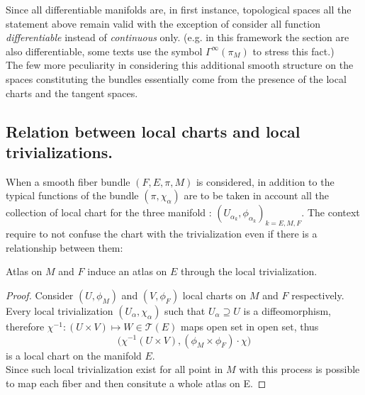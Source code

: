 \documentclass[a4paper,12pt]{scrartcl}    %
\begin{document}
Since all differentiable manifolds are, in first instance, topological spaces all the statement above remain valid with the exception of consider all function \emph{differentiable} instead of \emph{continuous} only.
(e.g. in this framework the section are also differentiable, some texts use the symbol $\Gamma^{\infty} (\pi_M)$ to stress this fact.) 
\\
The few more peculiarity in considering this additional smooth structure on the spaces constituting the bundles essentially come from the presence of the local charts and the tangent spaces.

\subsection{Relation between local charts and local trivializations.}
When a smooth fiber bundle $(F,E,\pi,M)$ is considered, in addition to the typical functions of the bundle $(\pi, \chi_{\alpha})$ are to be taken in account all the collection of local chart for the three manifold : $(U_{\alpha_k}, \phi_{\alpha_k})_{k = E,M,F}$.
The context require to not confuse the chart with the trivialization even if there is a relationship between them:

\begin{proposition}
Atlas on $M$ and $F$ induce an atlas on $E$ through the local trivialization.
\end{proposition}
\begin{proof}
Consider $(U, \phi_{M})$ and $(V, \phi_{F})$ local charts on $M$ and $F$ respectively.
\\
Every local trivialization $(U_{\alpha}, \chi_{\alpha})$ such that $U_{\alpha} \supseteq U$ is a diffeomorphism, 
\\
therefore $\chi^{-1}:(U \times V) \mapsto W \in \mathcal{T}(E)$ maps open set in open set, thus 
\begin{displaymath}
\big( \chi^{-1} ( U \times	V), (\phi_{M} \times \phi_{F}) \cdot \chi \big)
\end{displaymath}
is a local chart on the manifold $E$.
\\
Since such local trivialization exist for all point in $M$ with this process is possible to map each fiber and then consitute a whole atlas on E.
\end{proof}
\end{document}
